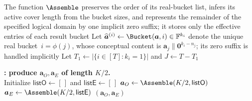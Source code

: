 \begin{algorithm}[!t]
\caption{Linear Operations for a Decreasing-Size BVA}
\label{alg:bva}


\BlankLine
The function $\Assemble$ preserves the order of its real-bucket list, infers
its active cover length from the bucket sizes, and represents the remainder of
the specified logical domain by one implicit zero suffix; it stores only the
effective entries of each result bucket\;
Let $\widehat{\bm{a}}^{(i)}\leftarrow\Bucket(\bm{a},i)\in\Field^{k_i}$ denote
the unique real bucket~$i=\phi(j)$, whose conceptual content is
$\bm{a}_j\|\bm{0}^{k_i-n_j}$; its zero suffix is handled implicitly\;
Let $T_1\leftarrow|\{i\in[T]:k_i=1\}|$ and $J\leftarrow T-T_1$\;

\BlankLine
\textbf{\KwSplit: produce $\bm{a}_O,\bm{a}_E$ of length $K/2$.}\\
Initialize $\mathsf{listO}\leftarrow[\,]$ and $\mathsf{listE}\leftarrow[\,]$\;
$\bm{a}_O\leftarrow\Assemble(K/2,\mathsf{listO})$\;
$\bm{a}_E\leftarrow\Assemble(K/2,\mathsf{listE})$\;
\Return $(\bm{a}_O,\bm{a}_E)$\;


\end{algorithm}
